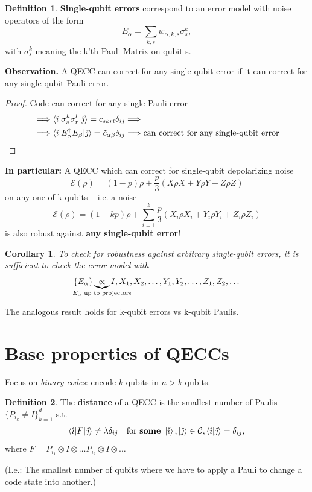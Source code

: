 \documentclass[a4paper, 12pt]{article}
\theoremstyle{plain}
\newtheorem*{corollary}{Corollary}
\theoremstyle{definition}
\newtheorem*{definition}{Definition}
\theoremstyle{remark}
\begin{document}
\begin{definition}
  \textbf{Single-qubit errors} correspond to an error model with noise operators of the form
  \[
    E_\alpha = \sum_{k,s} w_{\alpha,k,s} \sigma_s^{k},
  \]
  with $\sigma_s^k$ meaning the k'th Pauli Matrix on qubit s.
\end{definition}

\textbf{Observation.} A QECC can correct for any single-qubit error if it can correct for any single-qubit Pauli error.

\begin{proof}
  Code can correct for any single Pauli error
  \begin{align*}
    &\Longrightarrow\braket{\hat{\imath}|\sigma_s^k \sigma_r^l|\hat{\jmath}} = c_{skrl} \delta_{ij} \Longrightarrow \\
    &\Longrightarrow \braket{\hat{\imath}|E_\alpha^\dagger E_\beta|\hat{\jmath}} = \tilde{c}_{\alpha\beta} \delta_{ij} \Longrightarrow \text{can correct for any single-qubit error}
  \end{align*}
\end{proof}

\textbf{In particular:} A QECC which can correct for single-qubit depolarizing noise
\[
  \mathcal{E}(\rho) = (1-p)\rho + \frac{p}{3} (X\rho X + Y\rho Y + Z\rho Z)
\]
on any one of k qubits -- i.e. a noise
\[
  \mathcal{E}(\rho) = (1-kp)\rho + \sum_{i=1}^k \frac{p}{3} (X_i\rho X_i + Y_i\rho Y_i + Z_i\rho Z_i)
\]
is also robust against \textbf{any single-qubit error}!

\begin{corollary}
  To check for robustness against arbitrary single-qubit errors, it is sufficient to check the error model with
  \[
    \{E_\alpha\} \underbrace{\propto}_{\mathclap{E_\alpha \text{ up to projectors}}} {I, X_1, X_2, \ldots, Y_1, Y_2, \ldots, Z_1, Z_2, \ldots}
  \]
\end{corollary}

The analogous result holds for k-qubit errors vs k-qubit Paulis.

\section{Base properties of QECCs}
Focus on \emph{binary codes}: encode $k$ qubits in $n>k$ qubits.

\begin{definition}
  The \textbf{distance} of a QECC is the smallest number of Paulis $\{P_{i_k} \neq I\}_{k=1}^d$ s.t.
  \[
    \braket{\hat{\imath}|F|\hat{\jmath}} \neq \lambda \delta_{ij} \quad \text{for \textbf{some} } \ket{\hat{\imath}},\ket{\hat{\jmath}} \in \mathcal{C}, \braket{\hat{\imath}|\hat{\jmath}} = \delta_{ij},
  \]
  where $F = P_{i_1} \otimes I \otimes \ldots P_{i_2} \otimes I \otimes \ldots $

  (I.e.: The smallest number of qubits where we have to apply a Pauli to change a code state into another.)
\end{definition}
\end{document}
